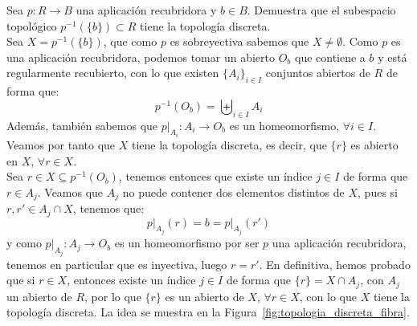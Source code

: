 \begin{ejercicio}\label{ej:1_top_triv} %
    Sea $p:R\to B$ una aplicación recubridora y $b\in B$. Demuestra que el subespacio topológico $p^{-1}(\{b\})\subset R$ tiene la topología discreta.\\

    Sea $X = p^{-1}(\{b\})$, que como $p$ es sobreyectiva sabemos que $X\neq \emptyset$. Como $p$ es una aplicación recubridora, podemos tomar un abierto $O_b$ que contiene a $b$ y está regularmente recubierto, con lo que existen $\{A_i\}_{i \in I}$ conjuntos abiertos de $R$ de forma que:
    \begin{equation*}
        p^{-1}(O_b) = \biguplus_{i \in I}A_i
    \end{equation*}
    Además, también sabemos que $p\big|_{A_i}:A_i\to O_b$ es un homeomorfismo, $\forall i \in I$. Veamos por tanto que $X$ tiene la topología discreta, es decir, que $\{r\}$ es abierto en $X$, $\forall r\in X$.\\

    Sea $r\in X\subseteq p^{-1}(O_b)$, tenemos entonces que existe un índice $j\in I$ de forma que $r\in A_j$. Veamos que $A_j$ no puede contener dos elementos distintos de $X$, pues si $r,r'\in A_j\cap X$, tenemos que:
    \begin{equation*}
        p\big|_{A_j}(r) = b = p\big|_{A_j}(r') 
    \end{equation*}
    y como $p\big|_{A_j}:A_j\to O_b$ es un homeomorfismo por ser $p$ una aplicación recubridora, tenemos en particular que es inyectiva, luego $r = r'$. En definitiva, hemos probado que si $r\in X$, entonces existe un índice $j\in I$ de forma que $\{r\} = X\cap A_j$, con $A_j$ un abierto de $R$, por lo que $\{r\}$ es un abierto de $X$, $\forall r\in X$, con lo que $X$ tiene la topología discreta. La idea se muestra en la Figura~\ref{fig:topologia_discreta_fibra}.
    \begin{figure}[h]
        \centering
\end{figure}
\end{ejercicio}
